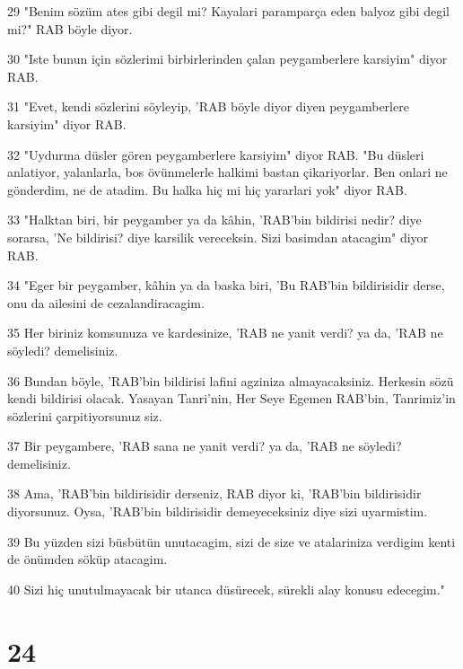 \par 29 "Benim sözüm ates gibi degil mi? Kayalari paramparça eden balyoz gibi degil mi?" RAB böyle diyor.
\par 30 "Iste bunun için sözlerimi birbirlerinden çalan peygamberlere karsiyim" diyor RAB.
\par 31 "Evet, kendi sözlerini söyleyip, 'RAB böyle diyor diyen peygamberlere karsiyim" diyor RAB.
\par 32 "Uydurma düsler gören peygamberlere karsiyim" diyor RAB. "Bu düsleri anlatiyor, yalanlarla, bos övünmelerle halkimi bastan çikariyorlar. Ben onlari ne gönderdim, ne de atadim. Bu halka hiç mi hiç yararlari yok" diyor RAB.
\par 33 "Halktan biri, bir peygamber ya da kâhin, 'RAB'bin bildirisi nedir? diye sorarsa, 'Ne bildirisi? diye karsilik vereceksin. Sizi basimdan atacagim" diyor RAB.
\par 34 "Eger bir peygamber, kâhin ya da baska biri, 'Bu RAB'bin bildirisidir derse, onu da ailesini de cezalandiracagim.
\par 35 Her biriniz komsunuza ve kardesinize, 'RAB ne yanit verdi? ya da, 'RAB ne söyledi? demelisiniz.
\par 36 Bundan böyle, 'RAB'bin bildirisi lafini agziniza almayacaksiniz. Herkesin sözü kendi bildirisi olacak. Yasayan Tanri'nin, Her Seye Egemen RAB'bin, Tanrimiz'in sözlerini çarpitiyorsunuz siz.
\par 37 Bir peygambere, 'RAB sana ne yanit verdi? ya da, 'RAB ne söyledi? demelisiniz.
\par 38 Ama, 'RAB'bin bildirisidir derseniz, RAB diyor ki, 'RAB'bin bildirisidir diyorsunuz. Oysa, 'RAB'bin bildirisidir demeyeceksiniz diye sizi uyarmistim.
\par 39 Bu yüzden sizi büsbütün unutacagim, sizi de size ve atalariniza verdigim kenti de önümden söküp atacagim.
\par 40 Sizi hiç unutulmayacak bir utanca düsürecek, sürekli alay konusu edecegim."

\chapter{24}

